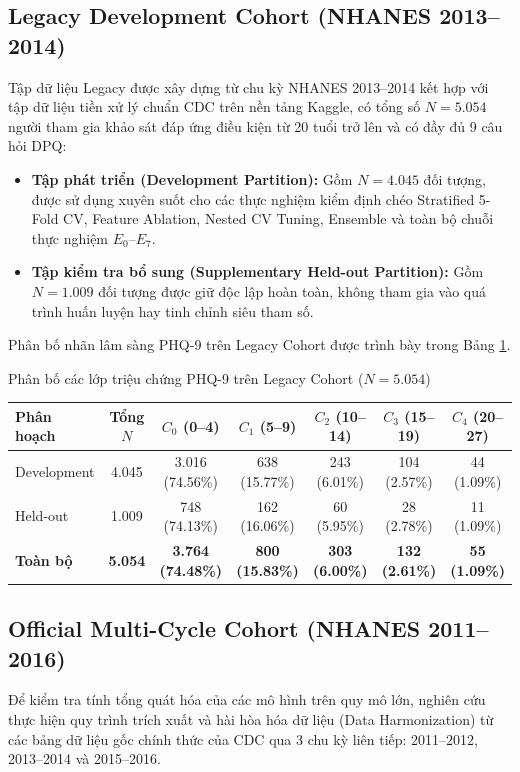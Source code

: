 \subsection{Legacy Development Cohort (NHANES 2013--2014)}
Tập dữ liệu Legacy được xây dựng từ chu kỳ NHANES 2013--2014 kết hợp với tập dữ liệu tiền xử lý chuẩn CDC trên nền tảng Kaggle, có tổng số $N = 5.054$ người tham gia khảo sát đáp ứng điều kiện từ 20 tuổi trở lên và có đầy đủ 9 câu hỏi DPQ:
\begin{itemize}
    \item \textbf{Tập phát triển (Development Partition):} Gồm $N = 4.045$ đối tượng, được sử dụng xuyên suốt cho các thực nghiệm kiểm định chéo Stratified 5-Fold CV, Feature Ablation, Nested CV Tuning, Ensemble và toàn bộ chuỗi thực nghiệm $E_0$--$E_7$.
    \item \textbf{Tập kiểm tra bổ sung (Supplementary Held-out Partition):} Gồm $N = 1.009$ đối tượng được giữ độc lập hoàn toàn, không tham gia vào quá trình huấn luyện hay tinh chỉnh siêu tham số.
\end{itemize}

Phân bố nhãn lâm sàng PHQ-9 trên Legacy Cohort được trình bày trong Bảng \ref{tab:legacy-class-dist}.

\begin{table}{Phân bố các lớp triệu chứng PHQ-9 trên Legacy Cohort ($N = 5.054$)}
\centering
\label{tab:legacy-class-dist}
\begin{tabular}{l c c c c c c}
\toprule
\textbf{Phân hoạch} & \textbf{Tổng $N$} & \textbf{$C_0$ (0--4)} & \textbf{$C_1$ (5--9)} & \textbf{$C_2$ (10--14)} & \textbf{$C_3$ (15--19)} & \textbf{$C_4$ (20--27)} \\
\midrule
Development & 4.045 & 3.016 (74.56\%) & 638 (15.77\%) & 243 (6.01\%) & 104 (2.57\%) & 44 (1.09\%) \\
Held-out & 1.009 & 748 (74.13\%) & 162 (16.06\%) & 60 (5.95\%) & 28 (2.78\%) & 11 (1.09\%) \\
\midrule
\textbf{Toàn bộ} & \textbf{5.054} & \textbf{3.764 (74.48\%)} & \textbf{800 (15.83\%)} & \textbf{303 (6.00\%)} & \textbf{132 (2.61\%)} & \textbf{55 (1.09\%)} \\
\bottomrule
\end{tabular}
\end{table}

\subsection{Official Multi-Cycle Cohort (NHANES 2011--2016)}
Để kiểm tra tính tổng quát hóa của các mô hình trên quy mô lớn, nghiên cứu thực hiện quy trình trích xuất và hài hòa hóa dữ liệu (Data Harmonization) từ các bảng dữ liệu gốc chính thức của CDC qua 3 chu kỳ liên tiếp: 2011--2012, 2013--2014 và 2015--2016.

